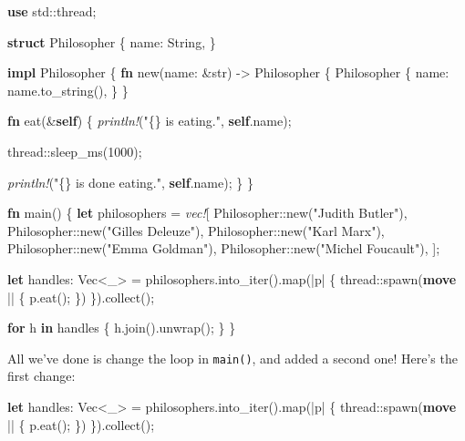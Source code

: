 \documentclass[a4paper,]{book}
\newenvironment{Shaded}{\begin{snugshade}}{\end{snugshade}}
\newcommand{\KeywordTok}[1]{\textcolor[rgb]{0.13,0.29,0.53}{\textbf{{#1}}}}
\newcommand{\DataTypeTok}[1]{\textcolor[rgb]{0.13,0.29,0.53}{{#1}}}
\newcommand{\DecValTok}[1]{\textcolor[rgb]{0.00,0.00,0.81}{{#1}}}
\newcommand{\StringTok}[1]{\textcolor[rgb]{0.31,0.60,0.02}{{#1}}}
\newcommand{\PreprocessorTok}[1]{\textcolor[rgb]{0.56,0.35,0.01}{\textit{{#1}}}}
\newcommand{\NormalTok}[1]{{#1}}
\begin{document}
\begin{Shaded}
\begin{Highlighting}[]
\KeywordTok{use} \NormalTok{std::thread;}

\KeywordTok{struct} \NormalTok{Philosopher \{}
    \NormalTok{name: }\DataTypeTok{String}\NormalTok{,}
\NormalTok{\}}

\KeywordTok{impl} \NormalTok{Philosopher \{}
    \KeywordTok{fn} \NormalTok{new(name: &}\DataTypeTok{str}\NormalTok{) -> Philosopher \{}
        \NormalTok{Philosopher \{}
            \NormalTok{name: name.to_string(),}
        \NormalTok{\}}
    \NormalTok{\}}

    \KeywordTok{fn} \NormalTok{eat(&}\KeywordTok{self}\NormalTok{) \{}
        \PreprocessorTok{println!}\NormalTok{(}\StringTok{"\{\} is eating."}\NormalTok{, }\KeywordTok{self}\NormalTok{.name);}

        \NormalTok{thread::sleep_ms(}\DecValTok{1000}\NormalTok{);}

        \PreprocessorTok{println!}\NormalTok{(}\StringTok{"\{\} is done eating."}\NormalTok{, }\KeywordTok{self}\NormalTok{.name);}
    \NormalTok{\}}
\NormalTok{\}}

\KeywordTok{fn} \NormalTok{main() \{}
    \KeywordTok{let} \NormalTok{philosophers = }\PreprocessorTok{vec!}\NormalTok{[}
        \NormalTok{Philosopher::new(}\StringTok{"Judith Butler"}\NormalTok{),}
        \NormalTok{Philosopher::new(}\StringTok{"Gilles Deleuze"}\NormalTok{),}
        \NormalTok{Philosopher::new(}\StringTok{"Karl Marx"}\NormalTok{),}
        \NormalTok{Philosopher::new(}\StringTok{"Emma Goldman"}\NormalTok{),}
        \NormalTok{Philosopher::new(}\StringTok{"Michel Foucault"}\NormalTok{),}
    \NormalTok{];}

    \KeywordTok{let} \NormalTok{handles: }\DataTypeTok{Vec}\NormalTok{<_> = philosophers.into_iter().map(|p| \{}
        \NormalTok{thread::spawn(}\KeywordTok{move} \NormalTok{|| \{}
            \NormalTok{p.eat();}
        \NormalTok{\})}
    \NormalTok{\}).collect();}

    \KeywordTok{for} \NormalTok{h }\KeywordTok{in} \NormalTok{handles \{}
        \NormalTok{h.join().unwrap();}
    \NormalTok{\}}
\NormalTok{\}}
\end{Highlighting}
\end{Shaded}

All we've done is change the loop in \texttt{main()}, and added a second
one! Here's the first change:

\begin{Shaded}
\begin{Highlighting}[]
\KeywordTok{let} \NormalTok{handles: }\DataTypeTok{Vec}\NormalTok{<_> = philosophers.into_iter().map(|p| \{}
    \NormalTok{thread::spawn(}\KeywordTok{move} \NormalTok{|| \{}
        \NormalTok{p.eat();}
    \NormalTok{\})}
\NormalTok{\}).collect();}
\end{Highlighting}
\end{Shaded}
\end{document}
